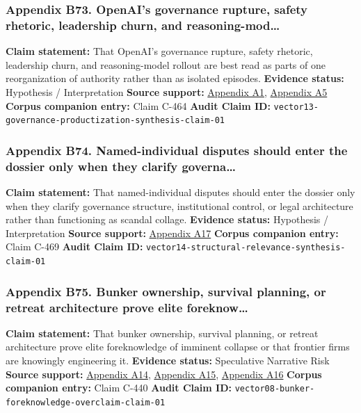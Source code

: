 \documentclass[
  american,
  11pt,
  letterpaper,
]{article}
\begin{document}
\subsubsection{Appendix B73. OpenAI's governance rupture, safety
rhetoric, leadership churn, and
reasoning-mod\ldots{}}\label{ch-08-appendix-b73-openai-s-governance-rupture-safety-rhetoric-leadership-churn-and-reasoning-mod}

\textbf{Claim statement:} That OpenAI's governance rupture, safety
rhetoric, leadership churn, and reasoning-model rollout are best read as
parts of one reorganization of authority rather than as isolated
episodes. \textbf{Evidence status:} Hypothesis / Interpretation
\textbf{Source support:}
\hyperref[ch-08-appendix-a1-openai-announces-leadership-transition]{Appendix
A1},
\hyperref[ch-08-appendix-a5-openai-board-forms-safety-and-security-committee]{Appendix
A5} \textbf{Corpus companion entry:} Claim C-464 \textbf{Audit Claim
ID:} \texttt{vector13-governance-productization-synthesis-claim-01}

\subsubsection{Appendix B74. Named-individual disputes should enter the
dossier only when they clarify
governa\ldots{}}\label{ch-08-appendix-b74-named-individual-disputes-should-enter-the-dossier-only-when-they-clarify-governa}

\textbf{Claim statement:} That named-individual disputes should enter
the dossier only when they clarify governance structure, institutional
control, or legal architecture rather than functioning as scandal
collage. \textbf{Evidence status:} Hypothesis / Interpretation
\textbf{Source support:}
\hyperref[ch-08-appendix-a17-musk-v-altman-4-24-cv-04722]{Appendix A17}
\textbf{Corpus companion entry:} Claim C-469 \textbf{Audit Claim ID:}
\texttt{vector14-structural-relevance-synthesis-claim-01}

\subsubsection{Appendix B75. Bunker ownership, survival planning, or
retreat architecture prove elite
foreknow\ldots{}}\label{ch-08-appendix-b75-bunker-ownership-survival-planning-or-retreat-architecture-prove-elite-foreknow}

\textbf{Claim statement:} That bunker ownership, survival planning, or
retreat architecture prove elite foreknowledge of imminent collapse or
that frontier firms are knowingly engineering it. \textbf{Evidence
status:} Speculative Narrative Risk \textbf{Source support:}
\hyperref[ch-08-appendix-a14-sam-altman-s-manifest-destiny]{Appendix
A14},
\hyperref[ch-08-appendix-a15-inside-mark-zuckerbergs-top-secret-hawaii-compound]{Appendix
A15},
\hyperref[ch-08-appendix-a16-mark-zuckerberg-downplays-his-5-000-square-foot-underground-bunker-in-hawaii-just-a-little-shelter]{Appendix
A16} \textbf{Corpus companion entry:} Claim C-440 \textbf{Audit Claim
ID:} \texttt{vector08-bunker-foreknowledge-overclaim-claim-01}
\end{document}
